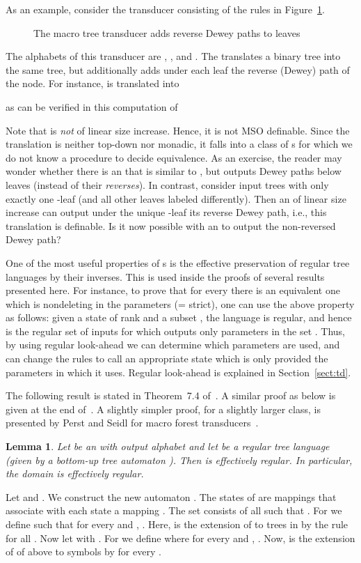 \documentclass[copyright,creativecommons]{eptcs}
\newtheorem{lemma}{Lemma}
\newcommand{\eop}{\hspace*{\fill}}
\newenvironment{proof}{{\it Proof.}\quad}{\eop\vspace*{4mm}}
\begin{document}
As an example, consider the transducer  consisting of the rules 
in Figure~\ref{fig:mtt}.
\begin{figure}[htb]

\caption{The macro tree transducer  adds reverse Dewey paths to leaves}\label{fig:mtt}
\end{figure}
The alphabets of this transducer are
,
, and 
.
The   translates a binary tree into the same tree, but additionally 
adds under each leaf the reverse (Dewey) path of the node.
For instance,  is translated into 

as can be verified in this computation of 

Note that  is \emph{not} of linear size increase. 
Hence, it is not MSO definable.
Since the translation is neither top-down nor monadic, it falls into
a class of s for which we do not know a procedure to decide
equivalence.
As an exercise, the reader may wonder whether there is an  that
is similar to , but outputs Dewey paths below leaves (instead of their \emph{reverses}).
In contrast,
consider input trees with only exactly one -leaf (and all other leaves labeled differently).
Then an  of linear size increase can output under the unique -leaf its 
reverse Dewey path, i.e., this translation is  definable. Is it now possible
with an  to output the non-reversed Dewey path?

One of the most useful properties of s is the effective preservation
of regular tree languages by their inverses.
This is used inside the proofs of several results presented here.
For instance, to prove that for every  there is an equivalent one
which is nondeleting in the parameters (= strict), one can use the above
property as follows: given a state  of rank  and a subset
, the language  is regular, and hence
 is the regular set of inputs for which  outputs
only parameters in the set . Thus, by using regular look-ahead
we can determine which parameters are used, and can change the rules 
to call an appropriate state  which is only provided the parameters
in  which it uses. Regular look-ahead is explained in Section~\ref{sect:td}.

The following result is stated in Theorem~7.4 of~\cite{DBLP:journals/jcss/EngelfrietV85}.
A similar proof as below is given at the end of~\cite{DBLP:journals/acta/EngelfrietM03}.
A slightly simpler proof, for a slightly larger class, is presented
by Perst and Seidl for macro forest transducers~\cite{DBLP:journals/ipl/PerstS04}.

\begin{lemma}\rm\label{lm:inv}
Let  be an  with output alphabet  and let
 be a regular tree language (given by a
bottom-up tree automaton ). Then  is effectively regular.
In particular, the domain  is effectively regular.
\end{lemma}
\begin{proof}
Let  and .
We construct the new automaton .
The states of  are mappings  that associate with 
each state  a mapping . 
The set  consists of all  such that .
For  we define
 such that 
for every  and , 
.
Here,  is the extension of  to trees in 
by the rule  for all .
Now let  with .
For  we define
 where
for every  and , 
.
Now,  is the extension of  of above 
to symbols  by 
 for
every .
\end{proof}
\end{document}
